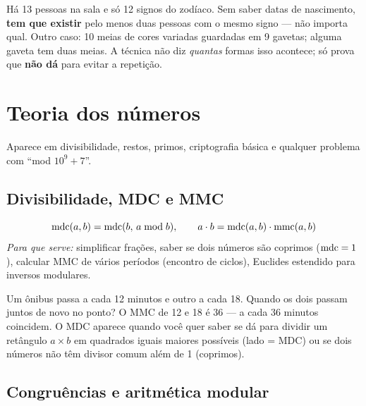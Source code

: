 \begin{exemplodiabox}
Há 13 pessoas na sala e só 12 signos do zodíaco. Sem saber datas de nascimento, \textbf{tem que existir} pelo menos duas pessoas com o mesmo signo --- não importa qual. Outro caso: 10 meias de cores variadas guardadas em 9 gavetas; alguma gaveta tem duas meias. A técnica não diz \emph{quantas} formas isso acontece; só prova que \textbf{não dá} para evitar a repetição.
\end{exemplodiabox}



\section{Teoria dos números}

Aparece em divisibilidade, restos, primos, criptografia básica e qualquer problema com ``mod $10^9+7$''.

\subsection{Divisibilidade, MDC e MMC}

\begin{equation}
  \operatorname{mdc}(a,b) = \operatorname{mdc}(b,\, a \bmod b), \qquad a \cdot b = \operatorname{mdc}(a,b) \cdot \operatorname{mmc}(a,b)
\end{equation}
\emph{Para que serve:} simplificar frações, saber se dois números são coprimos ($\operatorname{mdc}=1$), calcular MMC de vários períodos (encontro de ciclos), Euclides estendido para inversos modulares.

\begin{exemplodiabox}
Um ônibus passa a cada 12 minutos e outro a cada 18. Quando os dois passam juntos de novo no ponto? O MMC de 12 e 18 é 36 --- a cada 36 minutos coincidem. O MDC aparece quando você quer saber se dá para dividir um retângulo $a \times b$ em quadrados iguais maiores possíveis (lado = MDC) ou se dois números não têm divisor comum além de 1 (coprimos).
\end{exemplodiabox}



\subsection{Congruências e aritmética modular}

